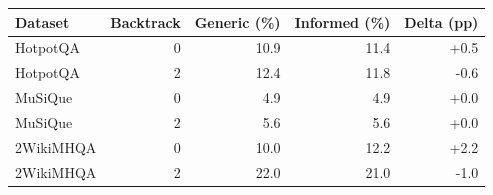 \begin{tabular}{@{}lrrrr@{}}
\toprule
Dataset & Backtrack & Generic (\%) & Informed (\%) & Delta (pp) \\
\midrule
HotpotQA & 0 & 10.9 & 11.4 & +0.5 \\
HotpotQA & 2 & 12.4 & 11.8 & -0.6 \\
MuSiQue & 0 & 4.9 & 4.9 & +0.0 \\
MuSiQue & 2 & 5.6 & 5.6 & +0.0 \\
2WikiMHQA & 0 & 10.0 & 12.2 & +2.2 \\
2WikiMHQA & 2 & 22.0 & 21.0 & -1.0 \\
\bottomrule
\end{tabular}
